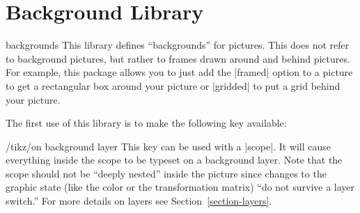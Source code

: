 %
%
%



\section{Background Library}

\label{section-tikz-backgrounds}

\begin{tikzlibrary}{backgrounds}
  This library defines ``backgrounds'' for pictures. This does not
  refer to background pictures, but rather to frames drawn around and
  behind pictures. For example, this package allows you to just add
  the |framed| option to a picture to get a rectangular box around
  your picture or |gridded| to put a grid behind your picture.
\end{tikzlibrary}


The first use of this library is to make the following key available:
\begin{key}{/tikz/on background layer}
  This key can be used with a |{scope}|. It will cause everything
  inside the scope to be typeset on a background layer. Note that the
  scope should not be ``deeply nested'' inside the picture since
  changes to the graphic state (like the color or the transformation
  matrix) ``do not survive a layer switch.'' For more details on
  layers see Section~\ref{section-layers}.

\begin{codeexample}[]
\end{codeexample}
\end{key}

